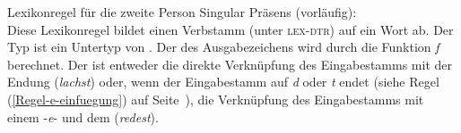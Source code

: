 \eas
\label{lr-verbal-inflection}%
Lexikonregel für die zweite Person Singular Präsens (vorläufig):\\
\zs
Diese Lexikonregel bildet einen Verbstamm (unter \textsc{lex-dtr}) auf ein Wort ab. Der Typ
 ist ein Untertyp von . Der \phonw des Ausgabezeichens wird durch
die Funktion \textit{f} berechnet. Der \phonw ist entweder die direkte Verknüpfung des Eingabestamms
mit der Endung  (\emph{lachst}) oder, wenn der Eingabestamm auf \emph{d} oder \emph{t}
endet (siehe Regel (\ref{Regel-e-einfuegung}) auf Seite~\pageref{Regel-e-einfuegung}), die
Verknüpfung des Eingabestamms mit einem -\emph{e}- und dem  (\emph{redest}).  

